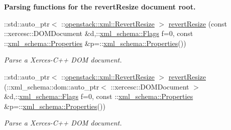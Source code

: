 \begin{Indent}{\bf Parsing functions for the revertResize document root.}
\begin{DoxyCompactItemize}
::std::auto\_\-ptr$<$ ::\hyperlink{classopenstack_1_1xml_1_1RevertResize}{openstack::xml::RevertResize} $>$ \hyperlink{namespaceopenstack_1_1xml_aa326ad4fa239ef5df271544f24cf4c05}{revertResize} (const ::xercesc::DOMDocument \&d,::\hyperlink{namespacexml__schema_affb4c227cbd9aa7453dd1dc5a1401943}{xml\_\-schema::Flags} f=0, const ::\hyperlink{namespacexml__schema_ad27ce19a7ee1d3b1064092648898f64c}{xml\_\-schema::Properties} \&p=::\hyperlink{namespacexml__schema_ad27ce19a7ee1d3b1064092648898f64c}{xml\_\-schema::Properties}())
\begin{DoxyCompactList}\small\item\em Parse a Xerces-\/C++ DOM document. \item\end{DoxyCompactList}\item 
::std::auto\_\-ptr$<$ ::\hyperlink{classopenstack_1_1xml_1_1RevertResize}{openstack::xml::RevertResize} $>$ \hyperlink{namespaceopenstack_1_1xml_a10277bbeb1ce8bcec5f3af93d731c349}{revertResize} (::xml\_\-schema::dom::auto\_\-ptr$<$ ::xercesc::DOMDocument $>$ \&d,::\hyperlink{namespacexml__schema_affb4c227cbd9aa7453dd1dc5a1401943}{xml\_\-schema::Flags} f=0, const ::\hyperlink{namespacexml__schema_ad27ce19a7ee1d3b1064092648898f64c}{xml\_\-schema::Properties} \&p=::\hyperlink{namespacexml__schema_ad27ce19a7ee1d3b1064092648898f64c}{xml\_\-schema::Properties}())
\begin{DoxyCompactList}\small\item\em Parse a Xerces-\/C++ DOM document. \item\end{DoxyCompactList}\end{DoxyCompactItemize}
\end{Indent}

